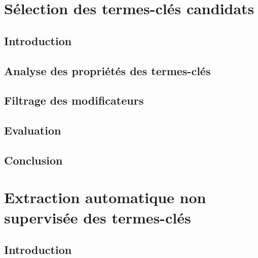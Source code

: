   \chapter{Sélection des termes-clés candidats }
  \label{chap:main-automatic_keyphrase_annotation-keyphrase_candidate_selection}
    \section{Introduction}
    \label{sec:main-automatic_keyphrase_annotation-keyphrase_candidate_selection-introduction}

    \section{Analyse des propriétés des termes-clés}
    \label{sec:main-automatic_keyphrase_annotation-keyphrase_candidate_selection-analysis_of_keyphrase_properties}

    \section{Filtrage des modificateurs}
    \label{sec:main-automatic_keyphrase_annotation-keyphrase_candidate_selection-modifiers_filtering}

    \section{Evaluation}
    \label{sec:main-automatic_keyphrase_annotation-keyphrase_candidate_selection-evaluation}

    \section{Conclusion}
    \label{sec:main-automatic_keyphrase_annotation-keyphrase_candidate_selection-conclusion}


  \chapter{Extraction automatique non supervisée des termes-clés }
  \label{chap:main-automatic_keyphrase_annotation-unsupervised_automatic_keyphrase_extraction}
    \section{Introduction}
    \label{sec:main-automatic_keyphrase_annotation-unsupervised_automatic_keyphrase_extraction-introduction}

